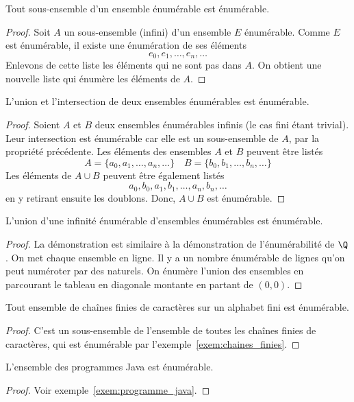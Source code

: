 \begin{myexem}
\begin{myprop}
	Tout sous-ensemble d'un ensemble énumérable est énumérable.
	\begin{proof}
Soit $A$ un sous-ensemble (infini) d'un ensemble $E$ énumérable. Comme $E$ est énumérable, il existe une énumération de ses éléments
\[
e_0, e_1, \ldots , e_n, \ldots
\]
Enlevons de cette liste les éléments qui ne sont pas dans $A$. On obtient une nouvelle liste qui énumère les éléments de $A$.
	\end{proof}
\end{myprop}

\begin{myprop}
	L'union et l'intersection de deux ensembles énumérables est énumérable.
	\begin{proof}
		Soient $A$ et $B$ deux ensembles énumérables infinis (le cas fini étant trivial). Leur intersection est énumérable car elle est un sous-ensemble de $A$, par la propriété précédente. Les éléments des ensembles $A$ et $B$ peuvent être listés
\[
A = \{ a_0, a_1, \ldots , a_n, \ldots\}  \quad
B = \{ b_0, b_1, \ldots , b_n, \ldots\}
\]
Les éléments de $A \cup B$ peuvent être également listés
\[
a_0, b_0, a_1, b_1, \ldots, a_n, b_n, \ldots
\]
en y retirant ensuite les doublons. Donc, $A \cup B$ est énumérable.
	\end{proof}
\end{myprop}

\begin{myprop}
	L'union d'une infinité énumérable d'ensembles énumérables est énumérable.
    \begin{proof}
      La démonstration est similaire à la démonstration de l'énumérabilité de $\Q$.
      On met chaque ensemble en ligne. Il y a un nombre énumérable de lignes qu'on peut numéroter par des naturels.
      On énumère l'union des ensembles en parcourant le tableau en diagonale montante en partant de $(0,0)$.
    \end{proof}
\end{myprop}

\begin{myprop}
 Tout ensemble de chaînes finies de caractères sur un alphabet fini est énumérable.
 \begin{proof}
C'est un sous-ensemble de l'ensemble de toutes les chaînes finies de caractères, qui est énumérable par l'exemple~\ref{exem:chaines_finies}.
 \end{proof}
\end{myprop}

\begin{myprop} \label{prop:programme_enumerable}
 L'ensemble des programmes Java est énumérable.
 \begin{proof}
  Voir exemple~\ref{exem:programme_java}.
 \end{proof}
\end{myprop}



\end{myexem}
